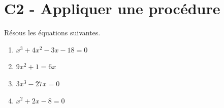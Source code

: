 \documentclass[a4paper, 12pt, parskip=half-]{scrartcl}
\begin{document}
\section*{C2 - Appliquer une procédure}
\begin{exercise}[points=11]
    Résous les équations suivantes.
    \begin{enumerate}[cols=2]
        \item %
              $x^{3}+4x^{2}-3x -18=0$
        \item %
              $9x^{2}+1=6x$
        \item %
              $3x^{3}-27x=0$
        \item %
              $x^{2}+2x-8 =0$
    \end{enumerate}
\end{exercise}
\end{document}

